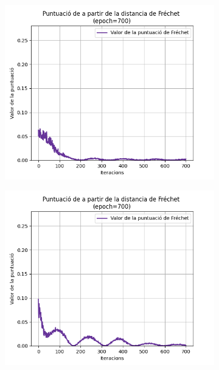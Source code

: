 \begin{figure}[H]
	\begin{subfigure}[b]{.32\linewidth}
		\includegraphics[width=\linewidth]{figures/data/FD_score_4.png}
		\caption{}
	\end{subfigure}
	\begin{subfigure}[b]{.32\linewidth}
		\includegraphics[width=\linewidth]{figures/data/FD_score_5.png}
		\caption{}
	\end{subfigure}
	\begin{subfigure}[b]{.32\linewidth}

\end{subfigure}
\end{figure}
